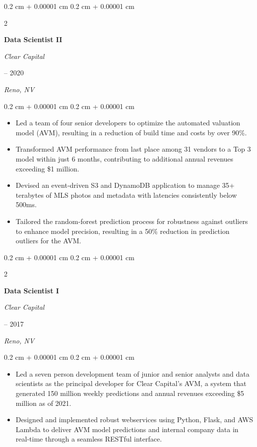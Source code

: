 \documentclass[11pt, letterpaper]{article}
\newenvironment{highlights}{
    \begin{itemize}[
        topsep=0.10 cm,
        parsep=0.10 cm,
        partopsep=0pt,
        itemsep=0pt,
        leftmargin=0.4 cm + 10pt
    ]
}{
    \end{itemize}
} %
\newenvironment{onecolentry}{
    \begin{adjustwidth}{
        0.2 cm + 0.00001 cm
    }{
        0.2 cm + 0.00001 cm
    }
}{
    \end{adjustwidth}
} %
\newenvironment{twocolentry}[2][]{
    \onecolentry
    \def\secondColumn{#2}
    \setcolumnwidth{\fill, 4.5 cm}
    \begin{paracol}{2}
}{
    \switchcolumn \raggedleft \secondColumn
    \end{paracol}
    \endonecolentry
} %
\begin{document}
\vspace{0.2 cm}
\begin{twocolentry}{
        2017 – 2020

        \textit{Reno, NV}
    }
    \textbf{Data Scientist II}

    \textit{Clear Capital}
\end{twocolentry}

\begin{onecolentry}
    \begin{highlights}

        \item Led a team of four senior developers to optimize the automated valuation
        model (AVM), resulting in a reduction of build time and costs by over 90\%.
        \item  Transformed AVM performance from last place among 31 vendors to a Top
        3 model within just 6 months, contributing to additional annual revenues
        exceeding \$1 million.
        \item Devised an event-driven S3 and DynamoDB application to manage 35+ terabytes
        of MLS photos and metadata with latencies consistently below 500ms.
        \item Tailored the random-forest prediction process for robustness against outliers to
        enhance model precision, resulting in a 50\% reduction in prediction outliers for the AVM.

    \end{highlights}
\end{onecolentry}

\vspace{0.2 cm}
\begin{twocolentry}{
        2015 – 2017

        \textit{Reno, NV}
    }
    \textbf{Data Scientist I}

    \textit{Clear Capital}
\end{twocolentry}

\begin{onecolentry}
    \begin{highlights}

        \item Led a seven person development team of junior and senior analysts and data
        scientists as the principal developer for Clear Capital's AVM, a system that
        generated 150 million weekly predictions and annual revenues exceeding \$5
        million as of 2021.
        \item Designed and implemented robust webservices using Python, Flask, and
        AWS Lambda to deliver AVM model predictions and internal company data in
        real-time through a seamless RESTful interface.

    \end{highlights}
\end{onecolentry}
\end{document}

